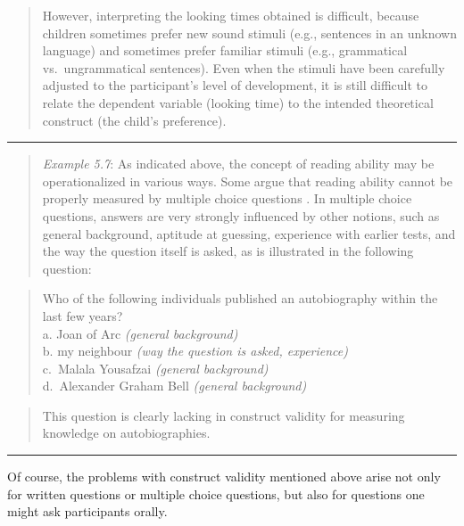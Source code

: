 \documentclass[
]{book}
\begin{document}
\begin{quote}
However, interpreting the looking times obtained is difficult, because children sometimes prefer new sound stimuli (e.g., sentences in an unknown language) and sometimes prefer familiar stimuli (e.g., grammatical vs.~ungrammatical sentences). Even when the stimuli have been carefully adjusted to the participant's level of development, it is still difficult to relate the dependent variable (looking time) to the intended theoretical construct (the child's preference).
\end{quote}

\begin{center}\rule{0.5\linewidth}{0.5pt}\end{center}

\begin{quote}
\emph{Example 5.7}: As indicated above, the concept of reading ability may be operationalized in various ways. Some argue that reading ability cannot be properly measured by multiple choice questions \citep{Shoh84, Houtm86}. In multiple choice questions, answers are very strongly influenced by other notions, such as general background, aptitude at guessing, experience with earlier tests, and the way the question itself is asked, as is illustrated in the following question:
\end{quote}

\begin{quote}
Who of the following individuals published an autobiography within the last few years?\\
a. Joan of Arc \emph{(general background)}\\
b. my neighbour \emph{(way the question is asked, experience)}\\
c.~Malala Yousafzai \emph{(general background)}\\
d.~Alexander Graham Bell \emph{(general background)}\\
\end{quote}

\begin{quote}
This question is clearly lacking in construct validity for measuring knowledge on autobiographies.
\end{quote}

\begin{center}\rule{0.5\linewidth}{0.5pt}\end{center}

Of course, the problems with construct validity mentioned above arise not only for written questions or multiple choice questions, but also for questions one might ask participants orally.
\end{document}
